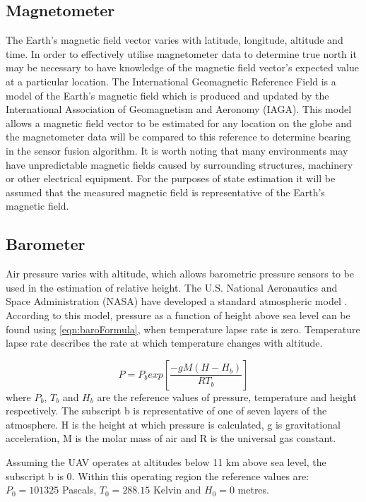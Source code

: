 \subsection{Magnetometer}
The Earth's magnetic field vector varies with latitude, longitude, altitude and time. In order to effectively utilise magnetometer data to determine true north it may be necessary to have knowledge of the magnetic field vector's expected value at a particular location. The International Geomagnetic Reference Field is a model of the Earth's magnetic field which is produced and updated by the International Association of Geomagnetism and Aeronomy (IAGA). This model allows a magnetic field vector to be estimated for any location on the globe and the magnetometer data will be compared to this reference to determine bearing in the sensor fusion algorithm. It is worth noting that many environments may have unpredictable magnetic fields caused by surrounding structures, machinery or other electrical equipment. For the purposes of state estimation it will be assumed that the measured magnetic field is representative of the Earth's magnetic field.

\subsection{Barometer}\label{section:barometerBackground}
Air pressure varies with altitude, which allows barometric pressure sensors to be used in the estimation of relative height. The U.S. National Aeronautics and Space Administration (NASA) have developed a standard atmospheric model \cite{Oceanic1976}. According to this model, pressure as a function of height above sea level can be found using \eqref{eqn:baroFormula}, when temperature lapse rate is zero. Temperature lapse rate describes the rate at which temperature changes with altitude. 

\begin{equation}\label{eqn:baroFormula}
P=P_{b}exp\left[\frac{-g M (H-H_{b})}{R T_{b}}\right]
\end{equation}
where $P_{b}$, $T_{b}$ and $H_{b}$ are the reference values of pressure, temperature and height respectively. The subscript b is representative of one of seven layers of the atmosphere. H is the height at which pressure is calculated, g is gravitational acceleration, M is the molar mass of air and R is the universal gas constant. 

Assuming the UAV operates at altitudes below 11 km above sea level, the subscript b is 0. Within this operating region the reference values are: $P_{0}=101 325$ Pascals, $T_{0}=288.15$ Kelvin and $H_{0}=0$ metres.

